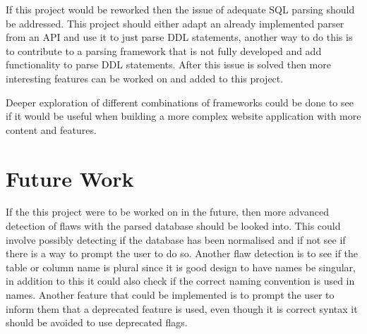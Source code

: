 If this project would be reworked then the issue of adequate SQL parsing should be addressed. This project should either adapt an already implemented parser from an API and use it to just parse DDL statements, another way to do this is to contribute to a parsing framework that is not fully developed and add functionality to parse DDL statements. After this issue is solved then more interesting features can be worked on and added to this project.

Deeper exploration of different combinations of frameworks could be done to see if it would be useful when building a more complex website application with more content and features. 


\section{Future Work}

If the this project were to be worked on in the future, then more advanced detection of flaws with the parsed database should be looked into. This could involve possibly detecting if the database has been normalised and if not see if there is a way to prompt the user to do so. Another flaw detection is to see if the table or column name is plural since it is good design to have names be singular, in addition to this it could also check if the correct naming convention is used in names. Another feature that could be implemented is to prompt the user to inform them that a deprecated feature is used, even though it is correct syntax it should be avoided to use deprecated flags.



